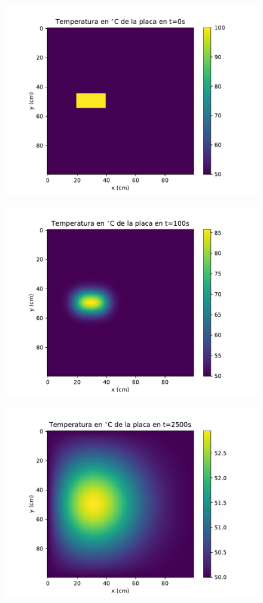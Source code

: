 \documentclass[12pt,letterpaper]{article}
\begin{document}
\begin{figure}[H]
\includegraphics{f1_0.pdf}
\centering
\end{figure}

\begin{figure}[H]
\includegraphics{f1_100.pdf}
\centering
\end{figure}

\begin{figure}[H]
\includegraphics{f1_2500.pdf}
\centering
\end{figure}
\end{document}
